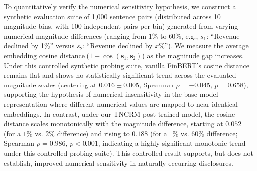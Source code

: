 \documentclass[journal]{IEEEtran}
\begin{document}
To quantitatively verify the numerical sensitivity hypothesis, we construct a synthetic evaluation suite of 1,000 sentence pairs (distributed across 10 magnitude bins, with 100 independent pairs per bin) generated from varying numerical magnitude differences (ranging from $1\%$ to $60\%$, e.g., $s_1$: ``Revenue declined by 1\%'' versus $s_2$: ``Revenue declined by $x$\%''). We measure the average embedding cosine distance ($1 - \cos(\mathbf{s}_1, \mathbf{s}_2)$) as the magnitude gap increases. Under this controlled synthetic probing suite, vanilla FinBERT's cosine distance remains flat and shows no statistically significant trend across the evaluated magnitude scales (centering at $0.016 \pm 0.005$, Spearman $\rho = -0.045$, $p = 0.658$), supporting the hypothesis of numerical insensitivity in the base model representation where different numerical values are mapped to near-identical embeddings. In contrast, under our TNCRM-post-trained model, the cosine distance scales monotonically with the magnitude difference, starting at $0.052$ (for a $1\%$ vs. $2\%$ difference) and rising to $0.188$ (for a $1\%$ vs. $60\%$ difference; Spearman $\rho = 0.986$, $p < 0.001$, indicating a highly significant monotonic trend under this controlled probing suite). This controlled result supports, but does not establish, improved numerical sensitivity in naturally occurring disclosures.
\end{document}
